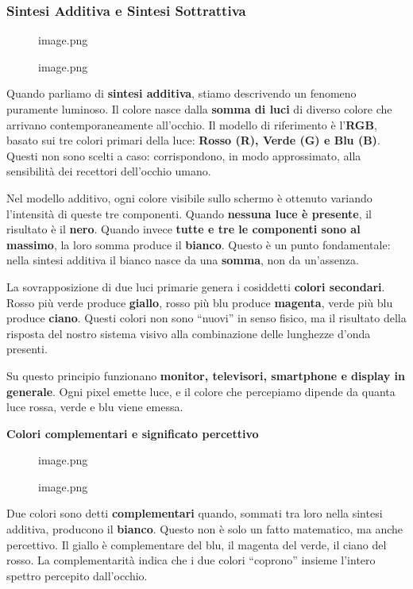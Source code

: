 \documentclass[
]{article}
\begin{document}
\hypertarget{sintesi-additiva-e-sintesi-sottrattiva-1}{%
\subsubsection{Sintesi Additiva e Sintesi Sottrattiva}\label{sintesi-additiva-e-sintesi-sottrattiva-1}}

\begin{figure}
\centering
{image.png}
\caption{image.png}
\end{figure}

Quando parliamo di \textbf{sintesi additiva}, stiamo descrivendo un fenomeno puramente luminoso. Il colore nasce dalla \textbf{somma di luci} di diverso colore che arrivano contemporaneamente all'occhio. Il modello di riferimento è l'\textbf{RGB}, basato sui tre colori primari della luce: \textbf{Rosso (R), Verde (G) e Blu (B)}. Questi non sono scelti a caso: corrispondono, in modo approssimato, alla sensibilità dei recettori dell'occhio umano.

Nel modello additivo, ogni colore visibile sullo schermo è ottenuto variando l'intensità di queste tre componenti. Quando \textbf{nessuna luce è presente}, il risultato è il \textbf{nero}. Quando invece \textbf{tutte e tre le componenti sono al massimo}, la loro somma produce il \textbf{bianco}. Questo è un punto fondamentale: nella sintesi additiva il bianco nasce da una \textbf{somma}, non da un'assenza.

La sovrapposizione di due luci primarie genera i cosiddetti \textbf{colori secondari}. Rosso più verde produce \textbf{giallo}, rosso più blu produce \textbf{magenta}, verde più blu produce \textbf{ciano}. Questi colori non sono ``nuovi'' in senso fisico, ma il risultato della risposta del nostro sistema visivo alla combinazione delle lunghezze d'onda presenti.

Su questo principio funzionano \textbf{monitor, televisori, smartphone e display in generale}. Ogni pixel emette luce, e il colore che percepiamo dipende da quanta luce rossa, verde e blu viene emessa.

\textbf{Colori complementari e significato percettivo}

\begin{figure}
\centering
{image.png}
\caption{image.png}
\end{figure}

Due colori sono detti \textbf{complementari} quando, sommati tra loro nella sintesi additiva, producono il \textbf{bianco}. Questo non è solo un fatto matematico, ma anche percettivo. Il giallo è complementare del blu, il magenta del verde, il ciano del rosso. La complementarità indica che i due colori ``coprono'' insieme l'intero spettro percepito dall'occhio.
\end{document}
